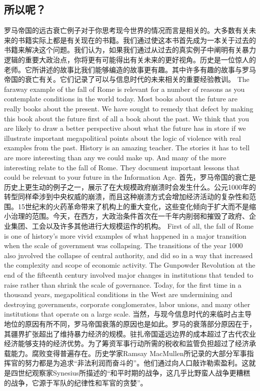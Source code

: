 \subsection{所以呢？} 
\begin{paracol}{2}
  罗马帝国的远古衰亡例子对于你思考现今世界的情况而言是相关的。大多数有关未来的书籍实际上都是有关现在的书籍。我们通过使这本书首先成为一本关于过去的书籍来解决这个问题。我们认为，如果我们通过从过去的真实例子中阐明有关暴力逻辑的重要大政治点，你将更有可能得出有关未来的更好视角。历史是一位惊人的老师。它所讲述的故事比我们能够编造的故事更有趣。其中许多有趣的故事与罗马帝国的衰亡有关。它们记录了可以与信息时代的未来相关的重要经验教训。
  \switchcolumn 
  The faraway example of the fall of Rome is relevant for a number of reasons as you contemplate conditions in the world today. Most books about the future are really books about the present. We have sought to remedy that defect by making this book about the future first of all a book about the past. We think that you are likely to draw a better perspective about what the future has in store if we illustrate important megapolitical points about the logic of violence with real examples from the past. History is an amazing teacher. The stories it has to tell are more interesting than any we could make up. And many of the more interesting relate to the fall of Rome. They document important lessons that could be relevant to your future in the Information Age.  
  \switchcolumn*
  首先，罗马帝国的衰亡是历史上更生动的例子之一，展示了在大规模政府崩溃时会发生什么。公元1000年的转型同样牵涉到中央权威的崩溃，而且这种崩溃方式会增加经济活动的复杂性和范围。15世纪末的火药革命带来了机构上的重大变化，这些变化倾向于扩大而不是缩小治理的范围。今天，在西方，大政治条件首次在一千年内削弱和摧毁了政府、企业集团、工会以及许多其他进行大规模运作的机构。
  \switchcolumn
  First of all, the fall of Rome is one of history's more vivid examples of what happened in a major transition when the scale of government was collapsing. The transitions of the year 1000 also jnvolved the collapse of central authority, and did so in a way that increased the complexity and scope of economic activity. The Gunpowder Revolution at the end of the fifteenth century involved major changes in institutions that tended to raise rather than shrink the scale of governance. Today, for the first time in a thousand years, megapolitical conditions in the West are undermining and destroying governments, corporate conglomerates, labor unions, and many other institutions that operate on a large scale.  
  \switchcolumn*
  当然，与现今信息时代的来临时占主导地位的原因有所不同，罗马帝国衰落的原因也是如此。罗马的衰落部分原因在于，其疆界扩张超出了维持暴力经济的规模。驻扎帝国遥远边界的成本超过了古代农业经济能够支持的经济优势。为了筹资军事行动所需的税收和监管负担超过了经济承载能力。腐败变得普遍存在。历史学家Ramsay MacMullen所记录的大部分军事指挥官的努力都是为追求“非法利润而奋斗的”。他们通过向人口敲诈勒索盈利。这就是四世纪观察家Synesius所描述的“和平时期的战争，这几乎比野蛮人战争更糟糕的战争，它源于军队的纪律性和军官的贪婪”。

\end{paracol}
